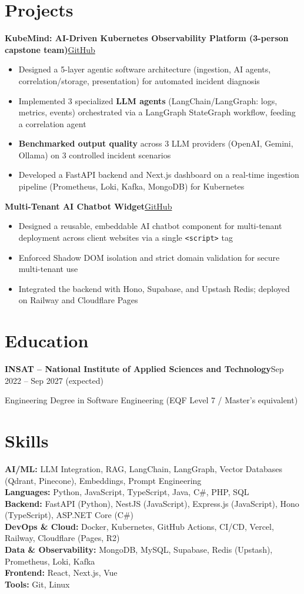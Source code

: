 \documentclass[10pt,a4paper]{article}
\newcommand{\entry}[2]{\vspace{1pt}\noindent\textbf{#1}\hfill{\color{muted}#2}\par}
\newcommand{\gh}[1]{\href{https://github.com/Hsan003/#1}{GitHub}}
\begin{document}
\section{Projects}
\entry{KubeMind: AI-Driven Kubernetes Observability Platform (3-person capstone team)}{\gh{kubemind}}
\begin{itemize}
  \item Designed a 5-layer agentic software architecture (ingestion, AI agents, correlation/storage, presentation) for automated incident diagnosis
  \item Implemented 3 specialized \textbf{LLM agents} (LangChain/LangGraph: logs, metrics, events) orchestrated via a LangGraph StateGraph workflow, feeding a correlation agent
  \item \textbf{Benchmarked output quality} across 3 LLM providers (OpenAI, Gemini, Ollama) on 3 controlled incident scenarios
  \item Developed a FastAPI backend and Next.js dashboard on a real-time ingestion pipeline (Prometheus, Loki, Kafka, MongoDB) for Kubernetes
\end{itemize}
\entry{Multi-Tenant AI Chatbot Widget}{\gh{AI-Assistant-Backend}}
\begin{itemize}
  \item Designed a reusable, embeddable AI chatbot component for multi-tenant deployment across client websites via a single \texttt{<script>} tag
  \item Enforced Shadow DOM isolation and strict domain validation for secure multi-tenant use
  \item Integrated the backend with Hono, Supabase, and Upstash Redis; deployed on Railway and Cloudflare Pages
\end{itemize}

\section{Education}
\entry{INSAT -- National Institute of Applied Sciences and Technology}{Sep 2022 -- Sep 2027 (expected)}
Engineering Degree in Software Engineering (EQF Level 7 / Master's equivalent)

\section{Skills}
\textbf{AI/ML:} LLM Integration, RAG, LangChain, LangGraph, Vector Databases (Qdrant, Pinecone), Embeddings, Prompt Engineering\\
\textbf{Languages:} Python, JavaScript, TypeScript, Java, C\#, PHP, SQL\\
\textbf{Backend:} FastAPI (Python), NestJS (JavaScript), Express.js (JavaScript), Hono (TypeScript), ASP.NET Core (C\#)\\
\textbf{DevOps \& Cloud:} Docker, Kubernetes, GitHub Actions, CI/CD, Vercel, Railway, Cloudflare (Pages, R2)\\
\textbf{Data \& Observability:} MongoDB, MySQL, Supabase, Redis (Upstash), Prometheus, Loki, Kafka\\
\textbf{Frontend:} React, Next.js, Vue\\
\textbf{Tools:} Git, Linux
\end{document}
